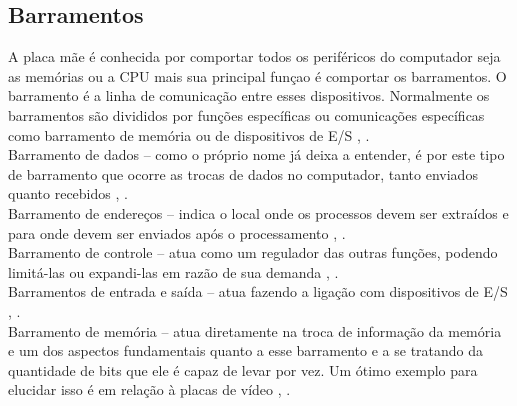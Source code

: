 \subsection{Barramentos}

A placa mãe é conhecida por comportar todos os periféricos do computador seja as memórias ou a CPU mais sua principal funçao é comportar os barramentos. O barramento é a linha de comunicação entre esses dispositivos. Normalmente os barramentos são divididos por funções específicas ou comunicações específicas como barramento de memória ou de dispositivos de E/S \cite{Tanenbaum2016}, \cite{Comer2012}.\\
Barramento de dados – como o próprio nome já deixa a entender, é por este tipo de barramento que ocorre as trocas de dados no computador, tanto enviados quanto recebidos \cite{Tanenbaum2016}, \cite{Comer2012}.\\
Barramento de endereços – indica o local onde os processos devem ser extraídos e para onde devem ser enviados após o processamento \cite{Tanenbaum2016}, \cite{Comer2012}.\\
Barramento de controle – atua como um regulador das outras funções, podendo limitá-las ou expandi-las em razão de sua demanda \cite{Tanenbaum2016}, \cite{Comer2012}.\\
Barramentos de entrada e saída – atua fazendo a ligação com dispositivos de E/S \cite{Tanenbaum2016}, \cite{Comer2012}.\\
Barramento de memória – atua diretamente na troca de informação da memória e um dos aspectos fundamentais quanto a esse  barramento e a se tratando da quantidade de bits que ele é capaz de levar por vez. Um ótimo exemplo para elucidar isso é em relação à placas de vídeo \cite{Tanenbaum2016}, \cite{Comer2012}.\\
